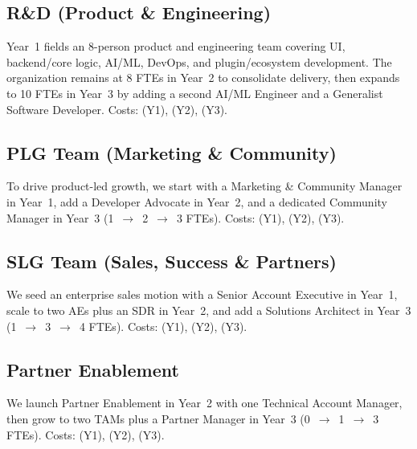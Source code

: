 \documentclass[11pt, a4paper, oneside]{article}
\begin{document}
\subsection{R\&D (Product \& Engineering)}
Year~1 fields an 8-person product and engineering team covering UI, backend/core logic, AI/ML, DevOps, and plugin/ecosystem development. The organization remains at 8 FTEs in Year~2 to consolidate delivery, then expands to 10 FTEs in Year~3 by adding a second AI/ML Engineer and a Generalist Software Developer. Costs: \textbf{} (Y1), \textbf{} (Y2), \textbf{} (Y3).

\subsection{PLG Team (Marketing \& Community)}
To drive product-led growth, we start with a Marketing \& Community Manager in Year~1, add a Developer Advocate in Year~2, and a dedicated Community Manager in Year~3 (1~$\rightarrow$~2~$\rightarrow$~3 FTEs). Costs: \textbf{} (Y1), \textbf{} (Y2), \textbf{} (Y3).

\subsection{SLG Team (Sales, Success \& Partners)}
We seed an enterprise sales motion with a Senior Account Executive in Year~1, scale to two AEs plus an SDR in Year~2, and add a Solutions Architect in Year~3 (1~$\rightarrow$~3~$\rightarrow$~4 FTEs). Costs: \textbf{} (Y1), \textbf{} (Y2), \textbf{} (Y3).

\subsection{Partner Enablement}
We launch Partner Enablement in Year~2 with one Technical Account Manager, then grow to two TAMs plus a Partner Manager in Year~3 (0~$\rightarrow$~1~$\rightarrow$~3 FTEs). Costs: \textbf{} (Y1), \textbf{} (Y2), \textbf{} (Y3).
\end{document}
